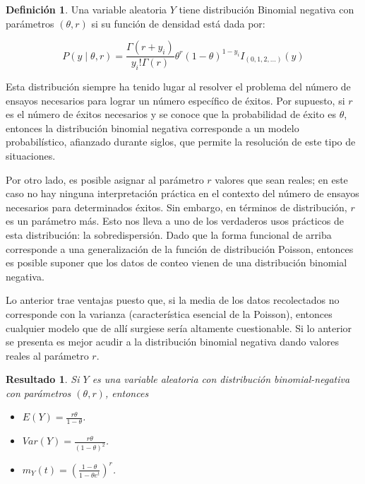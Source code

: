 \documentclass[
  10pt,
  spanish,
]{book}
\providecommand{\tightlist}{%
  \setlength{\itemsep}{0pt}\setlength{\parskip}{0pt}}
\newtheorem{proposition}{Resultado}[chapter]
\theoremstyle{definition}
\newtheorem{definition}{Definición}[chapter]
\theoremstyle{definition}
\theoremstyle{definition}
\theoremstyle{definition}
\theoremstyle{remark}
\begin{document}
\begin{definition}
\protect\hypertarget{def:unnamed-chunk-11}{}{\label{def:unnamed-chunk-11} }Una variable aleatoria \(Y\) tiene distribución Binomial negativa con parámetros \((\theta, r)\) si su función de densidad está dada por:

\begin{equation}
P(y\mid \theta, r)=\frac{\Gamma(r+y_i)}{y_i!\Gamma(r)}\theta^r(1-\theta)^{1-y_i}I_{(0,1,2,\ldots)}(y)
\end{equation}
\end{definition}

Esta distribución siempre ha tenido lugar al resolver el problema del número de ensayos necesarios para lograr un número específico de éxitos. Por supuesto, si \(r\) es el número de éxitos necesarios y se conoce que la probabilidad de éxito es \(\theta\), entonces la distribución binomial negativa corresponde a un modelo probabilístico, afianzado durante siglos, que permite la resolución de este tipo de situaciones.

Por otro lado, es posible asignar al parámetro \(r\) valores que sean reales; en este caso no hay ninguna interpretación práctica en el contexto del número de ensayos necesarios para determinados éxitos. Sin embargo, en términos de distribución, \(r\) es un parámetro más. Esto nos lleva a uno de los verdaderos usos prácticos de esta distribución: la sobredispersión. Dado que la forma funcional de arriba corresponde a una generalización de la función de distribución Poisson, entonces es posible suponer que los datos de conteo vienen de una distribución binomial negativa.

Lo anterior trae ventajas puesto que, si la media de los datos recolectados no corresponde con la varianza (característica esencial de la Poisson), entonces cualquier modelo que de allí surgiese sería altamente cuestionable. Si lo anterior se presenta es mejor acudir a la distribución binomial negativa dando valores reales al parámetro \(r\).

\begin{proposition}
\protect\hypertarget{prp:unnamed-chunk-12}{}{\label{prp:unnamed-chunk-12} }Si \(Y\) es una variable aleatoria con distribución binomial-negativa con parámetros \((\theta, r)\), entonces

\begin{itemize}
\tightlist
\item
  \(E(Y)=\frac{r\theta}{1-\theta}\).
\item
  \(Var(Y)=\frac{r\theta}{(1-\theta)^2}\).
\item
  \(m_Y(t)=\left(\frac{1-\theta}{1-\theta e^t}\right)^r\).
\end{itemize}
\end{proposition}
\end{document}
